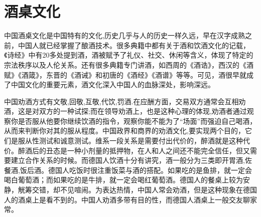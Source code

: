 \section{酒桌文化}
\par
中国酒桌文化是中国特有的文化,历史几乎与人的历史一样久远，早在汉字成熟之前，中国人就已经掌握了酿酒技术。很多典籍中都有关于酒和饮酒文化的记载，《诗经》中有20多处提到酒，酒被赋予了礼仪、社交、休闲等含义，体现了特定的宗法秩序以及人伦关系。还有很多典籍专门讲酒，如西周的《酒诰》，西汉的《酒赋》《酒箴》，东晋的《酒诫》和初唐的《酒经》《酒谱》等等。可见，酒很早就成了中国文化的重要元素，酒文化深入中国人的血脉深处，影响深远。
\par
中国劝酒方式有文敬,回敬,互敬,代饮,罚酒.在应酬方面，交易双方通常会互相劝酒，这是对双方的一种试探;而在领导劝酒上，也是这种心理的体现,劝酒者通过观察你是否服从他要你继续饮酒的指令，观察你能不能为了“场面”而强迫自己喝酒，从而来判断你对其的服从程度。中国政界和商界的劝酒文化,要实现两个目的，它们是服从性测试和诚意测试。维系一段关系是需要付出代价的，醉酒就是这种代价。醉酒后的丑态是一种小剂量的抵押物，在人和人之间还不能完全信任，但又需要建立合作关系的时候。而德国人饮酒十分有讲究，酒一般分为三类即开胃酒,佐餐酒,饭后酒。德国人吃饭时很注重饭菜与酒的搭配。如果吃的是鱼排，就一定会喝白葡萄酒；而如果吃的是牛排，就一定会喝红葡萄酒。德国人的餐桌上较为安静，觥筹交错，却不见喧闹。为表达热情，中国人常会劝酒，但是这种现象在德国人的酒桌上是看不到的。中国人劝酒多带有目的性，而德国人酒桌上一般交友聊家常。